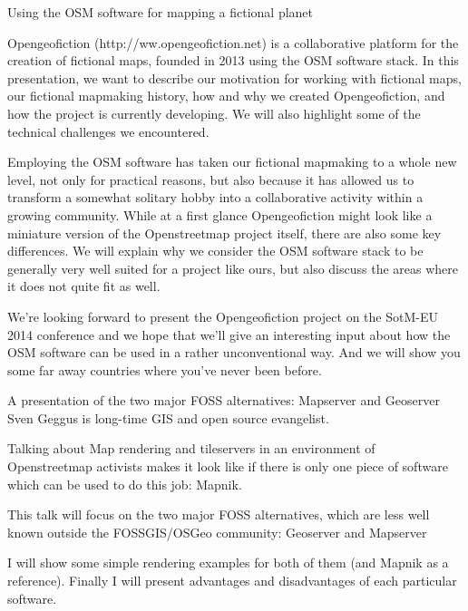 %
{Using the OSM software for mapping a fictional planet}%
{}%
{Opengeofiction (http://ww.opengeofiction.net) is a collaborative platform for the creation of fictional maps, founded in 2013 using the OSM software stack. In this presentation, we want to describe our motivation for working with fictional maps, our fictional mapmaking history, how and why we created Opengeofiction, and how the project is currently developing. We will also highlight some of the technical challenges we encountered.

Employing the OSM software has taken our fictional mapmaking to a whole new level, not only for practical reasons, but also because it has allowed us to transform a somewhat solitary hobby into a collaborative activity within a growing community. While at a first glance Opengeofiction might look like a miniature version of the Openstreetmap project itself, there are also some key differences. We will explain why we consider the OSM software stack to be generally very well suited for a project like ours, but also discuss the areas where it does not quite fit as well.

We're looking forward to present the Opengeofiction project on the SotM-EU 2014 conference and we hope that we'll give an interesting input about how the OSM software can be used in a rather unconventional way.  And we will show you some far away countries where you’ve never been before.}


%
{A presentation of the two major FOSS alternatives: Mapserver and Geoserver}%
{Sven Geggus is long-time GIS and open source evangelist.}%
{Talking about Map rendering and tileservers in an environment of Openstreetmap activists makes it look like if there is only one piece of software which can be used to do this job: Mapnik.

This talk will focus on the two major FOSS alternatives, which are less well
known outside the FOSSGIS/OSGeo community: Geoserver and Mapserver

I will show some simple rendering examples for both of them (and Mapnik as a reference). Finally I will present advantages and disadvantages of each particular software.}


